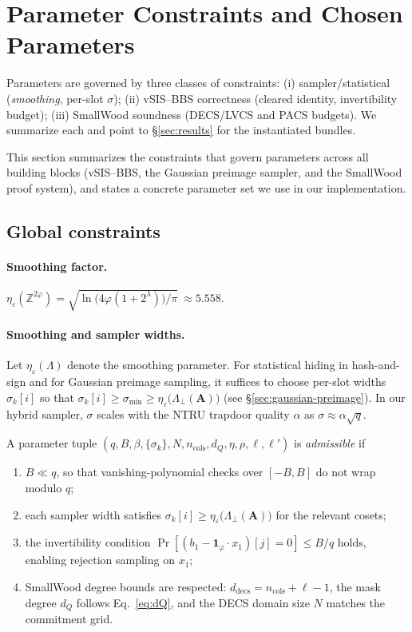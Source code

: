 \section{Parameter Constraints and Chosen Parameters}\label{sec:parameters}
\noindent Parameters are governed by three classes of constraints:
(i) sampler/statistical (\emph{smoothing}, per-slot $\sigma$); 
(ii) vSIS--BBS correctness (cleared identity, invertibility budget); 
(iii) SmallWood soundness (DECS/LVCS and PACS budgets). 
We summarize each and point to \S\ref{sec:results} for the instantiated bundles.

This section summarizes the constraints that govern parameters across all building blocks (vSIS--BBS, the Gaussian preimage sampler, and the SmallWood proof system), and states a concrete parameter set we use in our implementation.

\subsection{Global constraints}

\paragraph{Smoothing factor.}
$\eta_\varepsilon(\mathbb{Z}^{2\varphi})=\sqrt{\ln\!\bigl(4\varphi(1+2^{\lambda})\bigr)/\pi}\ \approx 5.558.$

\paragraph{Smoothing and sampler widths.}
Let $\eta_\varepsilon(\Lambda)$ denote the smoothing parameter. For statistical hiding in hash-and-sign and for Gaussian preimage sampling, it suffices to choose per-slot widths $\sigma_k[i]$ so that $\sigma_k[i]\ge \sigma_{\min}\ge \eta_\varepsilon\big(\Lambda_\perp(\mathbf{A})\big)$ (see \S\ref{sec:gaussian-preimage}). In our hybrid sampler, $\sigma$ scales with the NTRU trapdoor quality $\alpha$ as $\sigma\approx \alpha\sqrt{q}$.

\begin{definition}[Admissibility]\label{def:admissibility}
A parameter tuple $(q,B,\beta,\{\sigma_k\},N,n_{\mathrm{cols}},d_Q,\eta,\rho,\ell,\ell')$ is \emph{admissible} if
\begin{enumerate}[leftmargin=1.25em]
  \item $B\ll q$, so that vanishing-polynomial checks over $[-B,B]$ do not wrap modulo $q$;
  \item each sampler width satisfies $\sigma_k[i]\ge \eta_\varepsilon\big(\Lambda_\perp(\mathbf{A})\big)$ for the relevant cosets;
  \item the invertibility condition $\Pr[(b_1-\mathbf{1}_\varphi\!\cdot x_1)[j]=0]\le B/q$ holds, enabling rejection sampling on $x_1$;
  \item SmallWood degree bounds are respected: $d_{\mathrm{decs}}=n_{\mathrm{cols}}+\ell-1$, the mask degree $d_Q$ follows Eq.~\eqref{eq:dQ}, and the DECS domain size $N$ matches the commitment grid.
\end{enumerate}
\end{definition}


